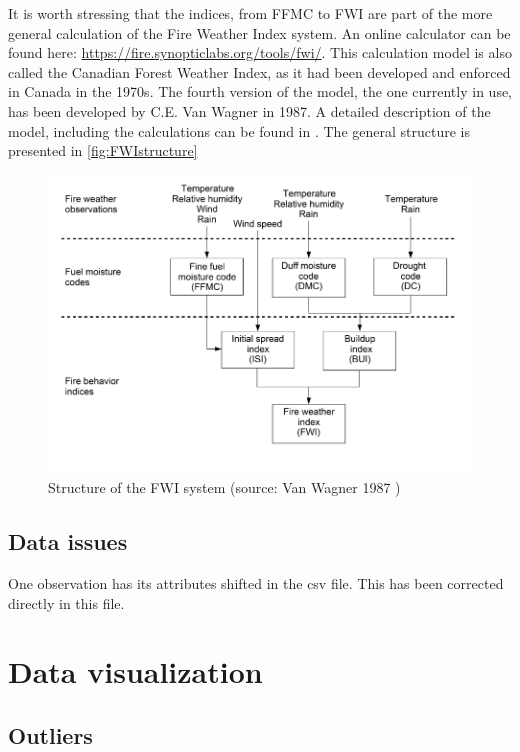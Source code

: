 \documentclass[10pt]{article}
\numberwithin{equation}{section}
\numberwithin{figure}{section}
\numberwithin{table}{section}
\begin{document}
It is worth stressing that the indices, from FFMC to FWI are part of the more general calculation of the Fire Weather Index system. An online calculator can be found here: \url{https://fire.synopticlabs.org/tools/fwi/}. This calculation model is also called the Canadian Forest Weather Index, as it had been developed and enforced in Canada in the 1970s. The fourth version of the model, the one currently in use, has been developed by C.E. Van Wagner in 1987. A detailed description of the model, including the calculations can be found in \cite{FWI_Wagner}. The general structure is presented in \autoref{fig:FWIstructure}

\begin{figure}[H]
    \centering
    \includegraphics[scale=0.8]{Figures/FWI_structure.png}
    \caption{Structure of the FWI system (source: Van Wagner 1987 \cite{FWI_Wagner})}
    \label{fig:FWIstructure}
\end{figure}

\subsection{Data issues}
One observation has its attributes shifted in the csv file. This has been corrected directly in this file.

\section{Data visualization}
\label{section:data visualisation}
\subsection{Outliers}
\end{document}
